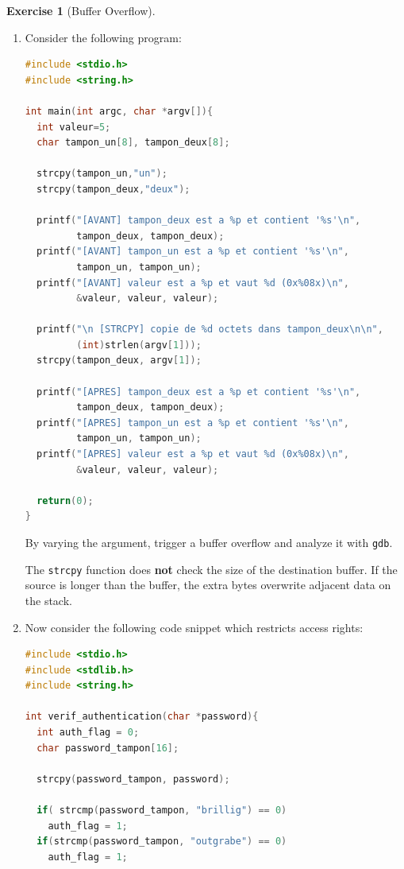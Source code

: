 \documentclass[a4paper,11pt]{article}
\theoremstyle{plain}
\theoremstyle{definition}
\newtheorem{exercice}{Exercise}
\begin{document}
\begin{exercice}[Buffer Overflow]
\begin{enumerate}
\item
Consider the following program:
\begin{lstlisting}[language=C]
#include <stdio.h>
#include <string.h>

int main(int argc, char *argv[]){
  int valeur=5;
  char tampon_un[8], tampon_deux[8];

  strcpy(tampon_un,"un");
  strcpy(tampon_deux,"deux");

  printf("[AVANT] tampon_deux est a %p et contient '%s'\n",
         tampon_deux, tampon_deux);
  printf("[AVANT] tampon_un est a %p et contient '%s'\n",
         tampon_un, tampon_un);
  printf("[AVANT] valeur est a %p et vaut %d (0x%08x)\n",
         &valeur, valeur, valeur);

  printf("\n [STRCPY] copie de %d octets dans tampon_deux\n\n",
         (int)strlen(argv[1]));
  strcpy(tampon_deux, argv[1]);

  printf("[APRES] tampon_deux est a %p et contient '%s'\n",
         tampon_deux, tampon_deux);
  printf("[APRES] tampon_un est a %p et contient '%s'\n",
         tampon_un, tampon_un);
  printf("[APRES] valeur est a %p et vaut %d (0x%08x)\n",
         &valeur, valeur, valeur);

  return(0);
}
\end{lstlisting}

By varying the argument, trigger a buffer overflow and analyze it with \texttt{gdb}.

\begin{pointcle}
The \texttt{strcpy} function does \textbf{not} check the size of the destination buffer. If the source is longer than the buffer, the extra bytes overwrite adjacent data on the stack.
\end{pointcle}

\item  Now consider the following code snippet which restricts access rights:

\begin{lstlisting}[language=C]
#include <stdio.h>
#include <stdlib.h>
#include <string.h>

int verif_authentication(char *password){
  int auth_flag = 0;
  char password_tampon[16];

  strcpy(password_tampon, password);

  if( strcmp(password_tampon, "brillig") == 0)
    auth_flag = 1;
  if(strcmp(password_tampon, "outgrabe") == 0)
    auth_flag = 1;


\end{lstlisting}
\end{enumerate}
\end{exercice}
\end{document}
